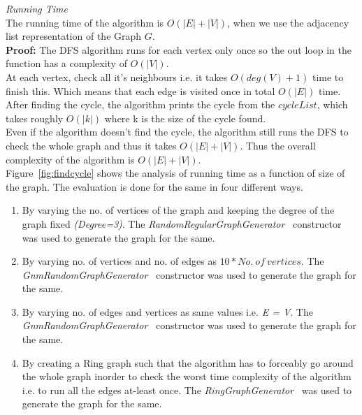 \documentclass{article}
\begin{document}
\textit{Running Time}\\ The running time of the algorithm is $O(|E|+|V|)$, when we use the adjacency list representation of the Graph $G$.\\
\textbf{Proof:} The DFS algorithm runs for each vertex only once so the out loop in the function has a complexity of $O(|V|)$.\\
At each vertex, check all it's neighbours i.e. it takes $O(deg(V)+1)$ time to finish this. Which means that each edge is visited once in total $O(|E|)$ time.\\
After finding the cycle, the algorithm prints the cycle from the $cycleList$, which takes roughly $O(|k|)$ where k is the size of the cycle found.\\
Even if the algorithm doesn't find the cycle, the algorithm still runs the DFS to check the whole graph and thus it takes $O(|E|+|V|)$.
Thus the overall complexity of the algorithm is $O(|E|+|V|)$.\\

Figure~\ref{fig:findcycle} shows the analysis of running time as a function of size of the graph. The evaluation is done for the same in four different ways. 
\begin{enumerate}
    \item By varying the no. of vertices of the graph and keeping the degree of the graph fixed \textit{(Degree=3)}. The \textit{RandomRegularGraphGenerator}~\cite{10.1145/3381449, kim2003generating} constructor was used to generate the graph for the same.
    \item By varying no. of vertices and no. of edges as $10*No.\ of\  vertices$. The \textit{GnmRandomGraphGenerator}~\cite{10.1145/3381449,erdos2011evolution} constructor was used to generate the graph for the same.
    \item By varying no. of edges and vertices as same values i.e. \textit{E = V}. The \textit{GnmRandomGraphGenerator}~\cite{10.1145/3381449,erdos2011evolution} constructor was used to generate the graph for the same.
    \item By creating a Ring graph such that the algorithm has to forceably go around the whole graph inorder to check the worst time complexity of the algorithm i.e. to run all the edges at-least once. The \textit{RingGraphGenerator}~\cite{10.1145/3381449} was used to generate the graph for the same.
\end{enumerate}
\end{document}
